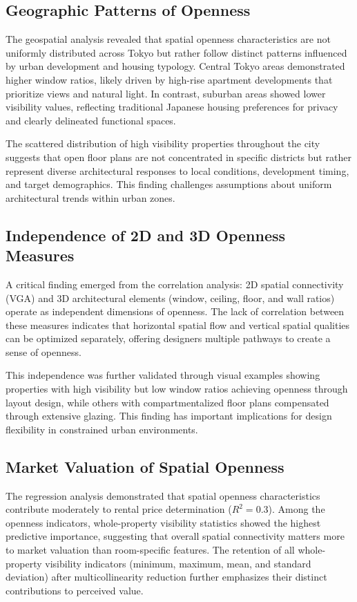 \subsection{Geographic Patterns of Openness}

The geospatial analysis revealed that spatial openness characteristics are not uniformly distributed 
across Tokyo but rather follow distinct patterns influenced by urban development and housing 
typology. Central Tokyo areas demonstrated higher window ratios, likely driven by high-rise 
apartment developments that prioritize views and natural light. In contrast, suburban areas showed 
lower visibility values, reflecting traditional Japanese housing preferences for privacy and clearly 
delineated functional spaces.

The scattered distribution of high visibility properties throughout the city suggests that open floor plans 
are not concentrated in specific districts but rather represent diverse architectural responses to 
local conditions, development timing, and target demographics. This finding challenges assumptions 
about uniform architectural trends within urban zones.

\subsection{Independence of 2D and 3D Openness Measures}

A critical finding emerged from the correlation analysis: 2D spatial connectivity (VGA) and 3D 
architectural elements (window, ceiling, floor, and wall ratios) operate as independent dimensions 
of openness. The lack of correlation between these measures indicates that horizontal spatial flow 
and vertical spatial qualities can be optimized separately, offering designers multiple pathways to 
create a sense of openness.

This independence was further validated through visual examples showing properties with high visibility but 
low window ratios achieving openness through layout design, while others with compartmentalized 
floor plans compensated through extensive glazing. This finding has important implications for 
design flexibility in constrained urban environments.

\subsection{Market Valuation of Spatial Openness}

The regression analysis demonstrated that spatial openness characteristics contribute moderately to 
rental price determination ($R^2 = 0.3$). Among the openness indicators, whole-property visibility 
statistics showed the highest predictive importance, suggesting that overall spatial connectivity 
matters more to market valuation than room-specific features. The retention of all whole-property 
visibility indicators (minimum, maximum, mean, and standard deviation) after multicollinearity reduction 
further emphasizes their distinct contributions to perceived value.


